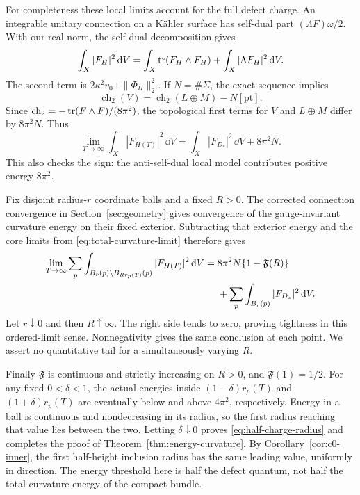 For completeness these local limits account for the full
defect charge. An integrable unitary connection on a
Kähler surface has self-dual part \((\Lambda F)\omega/2\).
With our real norm, the self-dual decomposition gives
\begin{equation}\label{eq:chern-weil-energy}
 \int_X|F_H|^2\,\mathrm d V
 =\int_X\operatorname{tr}(F_H\wedge F_H)
       +\int_X|\Lambda F_H|^2\,\mathrm d V .
\end{equation}
The second term is \(2\kappa^2v_0+\|\Phi_H\|_2^2\).
If \(N=\#\Sigma\), the exact sequence implies
\[
 \operatorname{ch}_2(V)
 =\operatorname{ch}_2(L\oplus M)-N[\mathrm{pt}].
\]
Since
\(\operatorname{ch}_2=-\operatorname{tr}(F\wedge F)/(8\pi^2)\),
the topological first terms for \(V\) and \(L\oplus M\)
differ by \(8\pi^2N\). Thus
\begin{equation}\label{eq:total-curvature-limit}
 \lim_{T\to\infty}\int_X|F_{H(T)}|^2\,\dd V
 =\int_X|F_{D_*}|^2\,\dd V+8\pi^2N.
\end{equation}
This also checks the sign: the anti-self-dual local
model contributes positive energy \(8\pi^2\).

Fix disjoint radius-\(r\) coordinate balls and a fixed
\(R>0\). The corrected connection convergence in
Section~\ref{sec:geometry} gives convergence of the
gauge-invariant curvature energy on their fixed
exterior. Subtracting that exterior energy and the
core limits from \eqref{eq:total-curvature-limit}
therefore gives
\begin{align}
 \lim_{T\to\infty}\sum_p
  \int_{B_r(p)\setminus B_{Rr_p(T)}(p)}
             |F_{H(T)}|^2\,\mathrm d V
 ={}&8\pi^2N\{1-\mathfrak F(R)\}\notag\\
    &+\sum_p\int_{B_r(p)}|F_{D_*}|^2\,\mathrm d V .
                                          \label{eq:ordered-tightness}
\end{align}
Let \(r\downarrow0\) and then \(R\uparrow\infty\).
The right side tends to zero, proving tightness in
this ordered-limit sense. Nonnegativity gives the
same conclusion at each point. We assert no
quantitative tail for a simultaneously varying \(R\).

Finally \(\mathfrak F\) is continuous and strictly
increasing on \(R>0\), and \(\mathfrak F(1)=1/2\).
For any fixed \(0<\delta<1\), the actual energies
inside \((1-\delta)r_p(T)\) and \((1+\delta)r_p(T)\)
are eventually below and above \(4\pi^2\), respectively.
Energy in a ball is continuous and nondecreasing
in its radius, so the first radius reaching that
value lies between the two. Letting
\(\delta\downarrow0\) proves \eqref{eq:half-charge-radius}
and completes the proof of
Theorem~\ref{thm:energy-curvature}.
By Corollary~\ref{cor:c0-inner}, the first half-height
inclusion radius has the same leading value, uniformly
in direction. The energy threshold here is half
the defect quantum, not half the total curvature
energy of the compact bundle.
